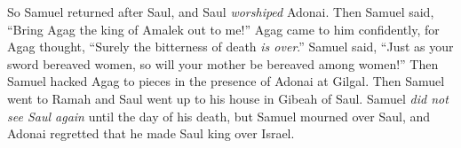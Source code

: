 \begin{biblechapter}
\verse So Samuel returned after Saul, and Saul \textit{worshiped} Adonai.
\verse Then Samuel said, “Bring Agag the king of Amalek out to me!” Agag came to him confidently, for Agag thought, “Surely the bitterness of death \textit{is over}.”
\verse Samuel said, “Just as your sword bereaved women, 
so will your mother be bereaved among women!” Then Samuel hacked Agag to pieces in the presence of Adonai at Gilgal.
\verse Then Samuel went to Ramah and Saul went up to his house in Gibeah of Saul.
\verse Samuel \textit{did not see Saul again} until the day of his death, but Samuel mourned over Saul, and Adonai regretted that he made Saul king over Israel.
\end{biblechapter}


